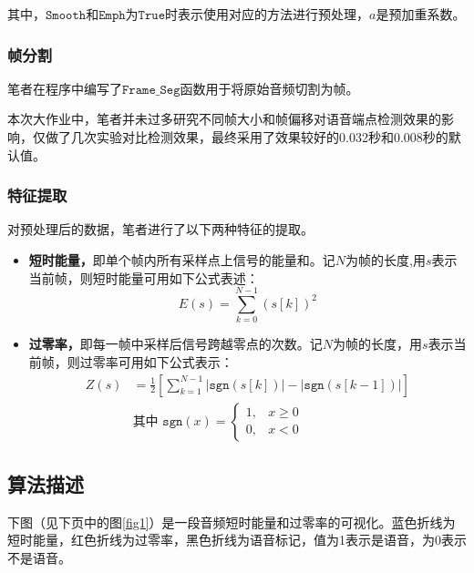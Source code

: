 \documentclass[a4paper]{article}
\begin{document}
其中，$\mathtt{Smooth}$和$\mathtt{Emph}$为$\mathtt{True}$时表示使用对应的方法进行预处理，$a$是预加重系数。

\subsubsection{帧分割}

笔者在程序中编写了$\mathtt{Frame\_Seg}$函数用于将原始音频切割为帧。

本次大作业中，笔者并未过多研究不同帧大小和帧偏移对语音端点检测效果的影响，仅做了几次实验对比检测效果，最终采用了效果较好的0.032秒和0.008秒的默认值。

\subsubsection{特征提取}

对预处理后的数据，笔者进行了以下两种特征的提取。

\begin{itemize}
    \item \textbf{短时能量，}即单个帧内所有采样点上信号的能量和。记$N$为帧的长度,用$s$表示当前帧，则短时能量可用如下公式表述：
    \begin{equation*}
        E(s) = \sum_{k=0}^{N-1}(s[k])^2
    \end{equation*}
    
    \item \textbf{过零率，}即每一帧中采样后信号跨越零点的次数。记$N$为帧的长度，用$s$表示当前帧，则过零率可用如下公式表示：
    \begin{align*}
        Z(s) & = \frac{1}{2}\left[\sum_{k=1}^{N-1} \big|\mathtt{sgn}(s[k])\big|-\big|\mathtt{sgn}(s[k-1])\big|\right] \\
        & \text{其中\ }\mathtt{sgn}(x)=\left\{\begin{array}{ll}
            1, & x\geq0 \\
            0, & x<0
        \end{array}\right.
    \end{align*}
\end{itemize}

\subsection{算法描述}

下图（见下页中的图\ref{fig1}）是一段音频短时能量和过零率的可视化。蓝色折线为短时能量，红色折线为过零率，黑色折线为语音标记，值为1表示是语音，为0表示不是语音。
\end{document}
